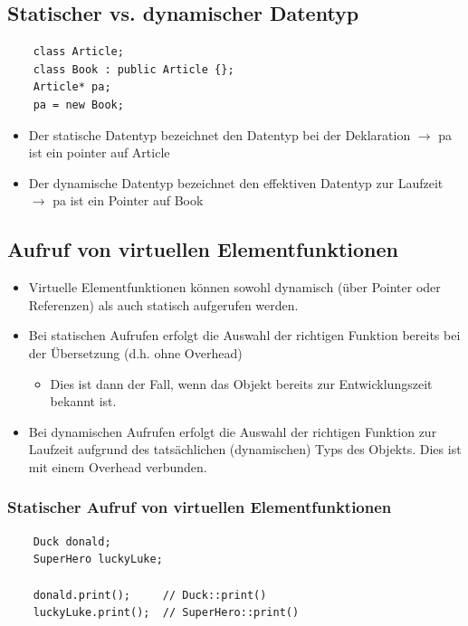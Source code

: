 \subsection{Statischer vs. dynamischer Datentyp}
\noindent
\begin{minipage}{\linewidth}
	\begin{lstlisting}
	class Article;
	class Book : public Article {};
	Article* pa;
	pa = new Book;
	\end{lstlisting}
\end{minipage}
\begin{itemize}
	\item Der statische Datentyp bezeichnet den Datentyp bei der Deklaration $\rightarrow$ pa ist ein pointer auf Article
	\item Der dynamische Datentyp bezeichnet den effektiven Datentyp zur Laufzeit $\rightarrow$ pa ist ein Pointer auf Book
\end{itemize}

\subsection{Aufruf von virtuellen Elementfunktionen}
\begin{itemize}
	\item Virtuelle Elementfunktionen können sowohl dynamisch (über Pointer oder Referenzen) als auch statisch aufgerufen werden.
	\item Bei statischen Aufrufen erfolgt die Auswahl der richtigen Funktion bereits bei der Übersetzung (d.h. ohne Overhead)
	\begin{itemize}
		\item Dies ist dann der Fall, wenn das Objekt bereits zur Entwicklungszeit bekannt ist.
	\end{itemize}
	\item Bei dynamischen Aufrufen erfolgt die Auswahl der richtigen Funktion zur Laufzeit aufgrund des tatsächlichen (dynamischen) Typs des Objekts. Dies ist mit einem Overhead verbunden.
\end{itemize}

\subsubsection{Statischer Aufruf von virtuellen Elementfunktionen}
\noindent
\begin{minipage}{\linewidth}
	\begin{lstlisting}
	Duck donald;
	SuperHero luckyLuke;
	
	donald.print();		// Duck::print()
	luckyLuke.print();	// SuperHero::print()
	\end{lstlisting}
\end{minipage}

